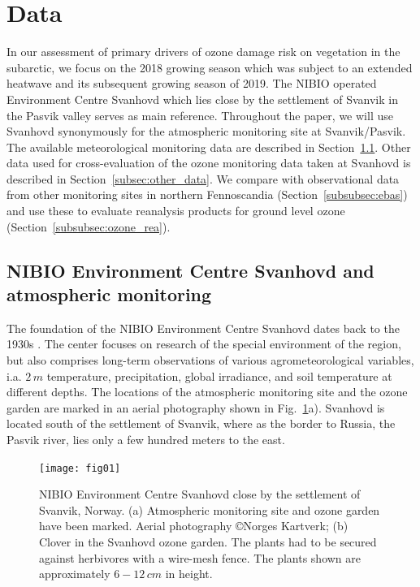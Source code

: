 \documentclass[bg, manuscript]{copernicus}
\begin{document}
\section{Data}
\label{sec:data}

In our assessment of primary drivers of ozone damage risk on vegetation in the subarctic, we focus on the 2018 growing season which was subject to an extended heatwave and its subsequent growing season of 2019. The NIBIO operated Environment Centre Svanhovd which lies close by the settlement of Svanvik in the Pasvik valley serves as main reference. Throughout the paper, we will use Svanhovd synonymously for the atmospheric monitoring site at Svanvik/Pasvik. The available meteorological monitoring data are described in Section~\ref{subsec:atmo_svanvik}. Other data used for cross-evaluation of the ozone monitoring data taken at Svanhovd is described in Section~\ref{subsec:other_data}. We compare with observational data from other monitoring sites in northern Fennoscandia (Section~\ref{subsubsec:ebas}) and use these to evaluate reanalysis products for ground level ozone (Section~\ref{subsubsec:ozone_rea}).

\subsection{NIBIO Environment Centre Svanhovd and atmospheric monitoring}
\label{subsec:atmo_svanvik}
The foundation of the NIBIO Environment Centre Svanhovd dates back to the 1930s \citep{NIBIO_Svanhovd}. The center focuses on research of the special environment of the region, but also comprises long-term observations of various agrometeorological variables, i.a. $2\,\unit{m}$ temperature, precipitation, global irradiance, and soil temperature at different depths. The locations of the atmospheric monitoring site and the ozone garden are marked in an aerial photography shown in Fig.~\ref{fig:svanhovd_research_station}a). Svanhovd is located south of the settlement of Svanvik, where as the border to Russia, the Pasvik river, lies only a few hundred meters to the east.\\

\begin{figure}[t]
  \texttt{[image: fig01]}
  \caption{NIBIO Environment Centre Svanhovd close by the settlement of Svanvik, Norway. (a) Atmospheric monitoring site and ozone garden have been marked. Aerial photography \copyright Norges Kartverk; (b) Clover in the Svanhovd ozone garden. The plants had to be secured against herbivores with a wire-mesh fence. The plants shown are approximately $6-12\,\unit{cm}$ in height.}
  \label{fig:svanhovd_research_station}
\end{figure}
\end{document}
